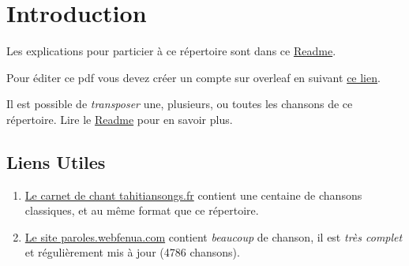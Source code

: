 
\newpage
\maketitle
\section*{Introduction}

\noindent Les explications pour particier à ce répertoire sont dans ce \href{https://github.com/tahitoaa/songbookreadme/blob/master/songbookreadme.md}{Readme}.

\noindent Pour éditer ce pdf vous devez créer un compte sur overleaf en suivant \href{https://fr.overleaf.com/9457921969mhjkwjdnycqj}{ce lien}.

\noindent Il est possible de \emph{transposer} une, plusieurs, ou toutes les chansons de ce répertoire. Lire le \href{https://github.com/tahitoaa/songbookreadme/blob/master/songbookreadme.md}{Readme} pour en savoir plus.


\subsection*{Liens Utiles}

\begin{enumerate}
    \item \href{http://tahitiansongs.fr/wp-content/uploads/2011/11/carnet_de_chants2.pdf}{Le carnet de chant tahitiansongs.fr} contient une centaine de chansons classiques, et au même format que ce répertoire.
    \item \href{http://paroles.webfenua.com/list.php}{Le site paroles.webfenua.com} contient \emph{beaucoup} de chanson, il est \emph{très complet} et régulièrement mis à jour (4786 chansons).
\end{enumerate}

\newpage
\tableofcontents
\newpage
